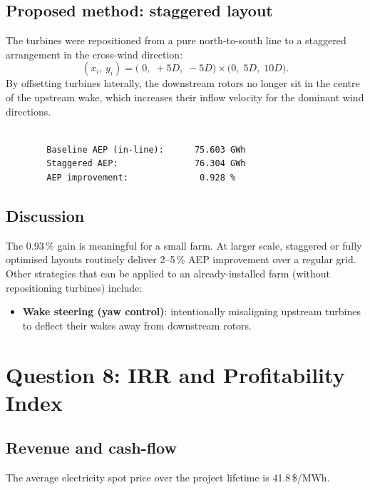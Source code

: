 \documentclass[11pt,a4paper]{article}
\begin{document}
	\subsection{Proposed method: staggered layout}
	
	The turbines were repositioned from a pure north-to-south line to a staggered
	arrangement in the cross-wind direction:
	\[
	(x_i,\,y_i) = \bigl(\;0,\;+5D,\;-5D\bigr) \times \bigl(0,\;5D,\;10D\bigr).
	\]
	By offsetting turbines laterally, the downstream rotors no longer sit in the
	centre of the upstream wake, which increases their inflow velocity for the
	dominant wind directions.
	
	\begin{lstlisting}
		
		Baseline AEP (in-line):      75.603 GWh
		Staggered AEP:               76.304 GWh
		AEP improvement:              0.928 %
	\end{lstlisting}
	
	\subsection{Discussion}
	
	The 0.93\,\% gain is meaningful for a small farm.  At larger scale, staggered or
	fully optimised layouts routinely deliver 2--5\,\% AEP improvement over a regular
	grid.  Other strategies that can be applied to an already-installed farm (without
	repositioning turbines) include:
	\begin{itemize}[leftmargin=1.5em]
		\item \textbf{Wake steering (yaw control)}: intentionally misaligning upstream
		turbines to deflect their wakes away from downstream rotors.
	\end{itemize}
	
	\section{Question 8: IRR and Profitability Index}
	
	\subsection{Revenue and cash-flow}
	
	The average electricity spot price over the project lifetime is
	41.8\,\$/MWh.
	
\end{document}
